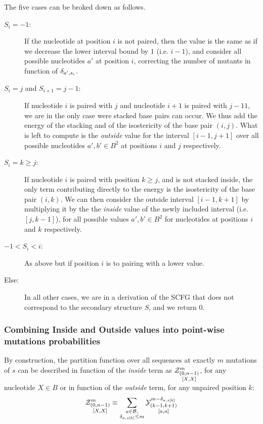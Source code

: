 The five cases can be broked down as follows.
\begin{description}
\item[$S_i=-1$:] If the nucleotide at position $i$ is not paired, then the value is the same
as if we decrease the lower interval bound by $1$ (i.e. $i-1$), and consider all possible
nucleotides $a'$ at position $i$, correcting the number of mutants
in function of $\delta_{a',s_i}$.
\item[$S_{i}=j$ and $S_{i+1}=j-1$:] If nucleotide $i$ is paired with $j$ and nucleotide $i+1$ is
paired with $j-11$, we are in the only case were stacked base pairs can occur. We thus add
the energy of the stacking and of the isostericity of the base pair $(i,j)$. What is left
to compute is the \emph{outside} value for the interval $[i-1,j+1]$ over all possible nucleotides 
$a',b'\in B^2$ at positions $i$ and $j$ respectively.
\item[$S_{i}=k \geq j$:]If nucleotide $i$ is paired with position $k\geq j$, 
and is not stacked inside, the 
only term contributing directly to the energy is the isostericity of the base pair $(i,k)$. 
We can then consider the outside interval $[i-1,k+1]$ by multiplying it by the the \emph{inside}
value of the newly included interval (i.e. $[j,k-1]$), for 
all possible values $a',b'\in B^2$ for nucleotides at positions $i$ and $k$ respectively.
\item[$-1<S_{i}<i$:]As above but if position $i$ is to pairing with a lower value.
\item[Else:] In all other cases, we are in a derivation of the SCFG that does not correspond to the 
secondary structure $S$, and we return $0$.


\end{description}

\subsubsection{Combining Inside and Outside values into point-wise mutations probabilities}
By construction, the partition function over all sequences at exactly $m$ mutations of $s$ can 
be described in function of the \emph{inside} term as $\Z{0,n-1}{m}{X,X}$,
 for any nucleotide $X\in B$ or
in function of the \emph{outside} term, for any unpaired position $k$:
$$
	\Z{0,n-1}{m}{X,X}
	\equiv
	\sum_{\substack{a\in \B,\\ \Kron_{a,s[k]}\le m}}	
	\Y{k-1,k+1}{m-\Kron_{a,s[k]}}{a,a}
$$

